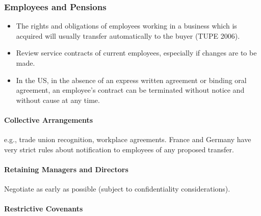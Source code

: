 \documentclass[
]{article}
\providecommand{\tightlist}{%
  \setlength{\itemsep}{0pt}\setlength{\parskip}{0pt}}
\begin{document}
\hypertarget{employees-and-pensions}{%
\subsubsection{Employees and Pensions}\label{employees-and-pensions}}

\begin{itemize}
\tightlist
\item
  The rights and obligations of employees working in a business which is
  acquired will usually transfer automatically to the buyer (TUPE 2006).
\item
  Review service contracts of current employees, especially if changes
  are to be made.
\item
  In the US, in the absence of an express written agreement or binding
  oral agreement, an employee's contract can be terminated without
  notice and without cause at any time.
\end{itemize}

\hypertarget{collective-arrangements}{%
\paragraph{Collective Arrangements}\label{collective-arrangements}}

e.g., trade union recognition, workplace agreements. France and Germany
have very strict rules about notification to employees of any proposed
transfer.

\hypertarget{retaining-managers-and-directors}{%
\paragraph{Retaining Managers and
Directors}\label{retaining-managers-and-directors}}

Negotiate as early as possible (subject to confidentiality
considerations).

\hypertarget{restrictive-covenants}{%
\paragraph{Restrictive Covenants}\label{restrictive-covenants}}
\end{document}
